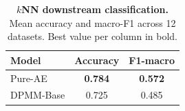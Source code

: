 \begin{table}[!htbp]
\centering
\caption{\textbf{$k$NN downstream classification.} Mean accuracy and macro-F1 across 12 datasets. Best value per column in bold.}
\label{tab:dpmm_knn}
\begin{tabular}{lcc}
\toprule
Model & Accuracy & F1-macro \\
\midrule
Pure-AE & \textbf{0.784} & \textbf{0.572} \\
DPMM-Base & 0.725 & 0.485 \\
\bottomrule
\end{tabular}
\end{table}
